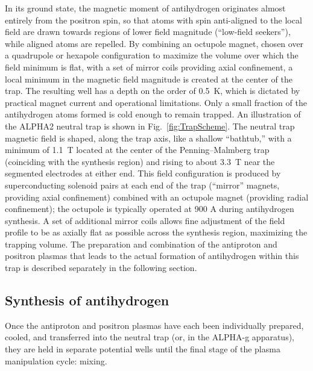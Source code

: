 In its ground state, the magnetic moment of antihydrogen originates almost entirely from the positron spin, so that atoms with spin anti-aligned to the local field are drawn towards regions of lower field magnitude (``low-field seekers''), while aligned atoms are repelled. By combining an octupole magnet, chosen over a quadrupole or hexapole configuration to maximize the volume over which the field minimum is flat, with a set of mirror coils providing axial confinement, a local minimum in the magnetic field magnitude is created at the center of the trap. The resulting well has a depth on the order of \SI{0.5}{ \kelvin}, which is dictated by practical magnet current and operational limitations. Only a small fraction of the antihydrogen atoms formed is cold enough to remain trapped. An illustration of the ALPHA2 neutral trap is shown in Fig.~\ref{fig:TrapScheme}. The neutral trap magnetic field is shaped, along the trap axis, like a shallow ``bathtub,'' with a minimum of \SI{1.1}{\tesla} located at the center of the Penning--Malmberg trap (coinciding with the synthesis region) and rising to about \SI{3.3}{\tesla} near the segmented electrodes at either end. This field configuration is produced by superconducting solenoid pairs at each end of the trap (``mirror'' magnets, providing axial confinement) combined with an octupole magnet (providing radial confinement); the octupole is typically operated at 900 A during antihydrogen synthesis. A set of additional mirror coils allows fine adjustment of the field profile to be as axially flat as possible across the synthesis region, maximizing the trapping volume. The preparation and combination of the antiproton and positron plasmas that leads to the actual formation of antihydrogen within this trap is described separately in the following section.


\subsection{Synthesis of antihydrogen} \label{sec:antihydrogensynthesis}

Once the antiproton and positron plasmas have each been individually prepared, cooled, and transferred into the neutral trap (or, in the ALPHA-g apparatus), they are held in separate potential wells until the final stage of the plasma manipulation cycle: mixing. 

